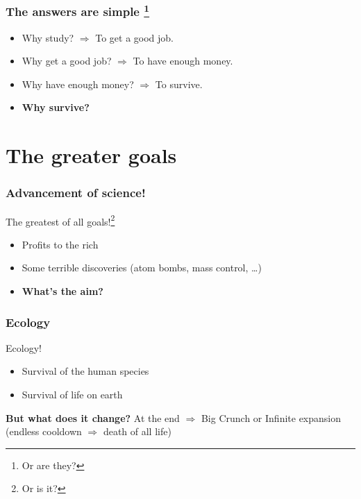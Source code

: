 \documentclass{beamer}
\begin{document}
    \begin{frame}
    	\frametitle{The answers are simple \footnote{Or are they?}}
    		
		\begin{itemize}[<+->]
			\item Why study? $\Rightarrow$ To get a good job.
			\item Why get a good job? $\Rightarrow$ To have enough money.
			\item Why have enough money? $\Rightarrow$ To survive.
			\item \textbf{Why survive?}
		\end{itemize}		    		
    \end{frame}
    
	\section{The greater goals}    
    
    \begin{frame}
    		\frametitle{Advancement of science!}
    		
    		The greatest of all goals!\footnote{Or is it?}
    		\begin{itemize}[<+->]
    			\item Profits to the rich
    			\item Some terrible discoveries (atom bombs, mass control, \dots)
    			\item \textbf{What's the aim?}
    		\end{itemize}
    \end{frame}
    
    \begin{frame}
    	\frametitle{Ecology}
    		
    	Ecology!
    	\begin{itemize}[<+->]
    		\item Survival of the human species 
    		\item Survival of life on earth
    	\end{itemize}
    		
		\pause
    		
    	\textbf{But what does it change?} At the end $\Rightarrow$ Big Crunch or Infinite expansion (endless cooldown $\Rightarrow$ death of all life)
    		
    		
    \end{frame}
    
\end{document}
